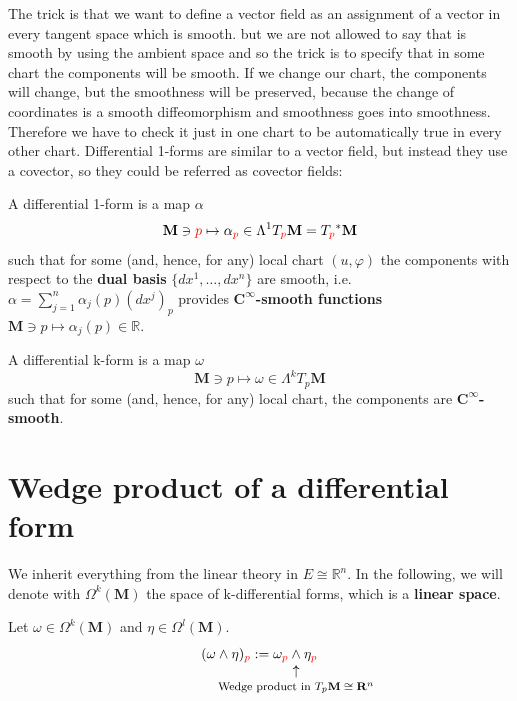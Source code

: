 \documentclass[../main.tex]{subfiles}
\begin{document}
The trick is that we want to define a vector field as an assignment of a vector in every tangent space which is smooth. but we are not allowed to say that is smooth by using the ambient space and so the trick is to specify that in some chart the components will be smooth. If we change our chart, the components will change, but the smoothness will be preserved, because the change of coordinates is a smooth diffeomorphism and smoothness goes into smoothness. Therefore we have to check it just in one chart to be automatically true in every other chart. Differential 1-forms are similar to a vector field, but instead they use a covector, so they could be referred as covector fields:
\begin{definition}
A differential 1-form is a map $\alpha$
\[
\mathbf{M}\ni{\color{red}p}\mapsto \alpha_{\color{red}p}\in\Lambda^1 T_{\color{red}p}\mathbf{M}=T_{\color{red}p}^*\mathbf{M}\]
such that for some (and, hence, for any) local chart $(u,\varphi)$ the components with respect to the \textbf{dual basis} $\{dx^1,\dots,dx^n\}$ are smooth, i.e. $\alpha=\sum_{j=1}^n\alpha_j(p)(dx^j)_p$ provides $\mathbf{C^{\infty}}$\textbf{-smooth functions} $\mathbf{M}\ni p \mapsto \alpha_j(p)\in\mathbb{R}$.
\end{definition}

\begin{definition}
A differential k-form is a map $\omega$ \[\mathbf{M}\ni p\mapsto\omega\in\Lambda^k T_p\mathbf{M}\] such that for some (and, hence, for any) local chart, the components are $\mathbf{C^{\infty}}$\textbf{-smooth}.
\end{definition}

\section{Wedge product of a differential form}
We inherit everything from the linear theory in $E\cong\mathbb{R}^n$. In the following, we will denote with $\Omega^k(\mathbf{M})$ the space of k-differential forms, which is a \textbf{linear space}.

\begin{definition}
Let $\omega\in\Omega^k(\mathbf{M})$ and $\eta\in\Omega^l(\mathbf{M})$.
\[
(\omega\wedge\eta)_{\color{red}p}:=\omega_{\color{red}p}\underset{\mathclap{\tikz \node {$\uparrow$} node [below=1ex] {\footnotesize Wedge product in $T_p\mathbf{M}\cong\mathbf{R}^n$ };}}\wedge\eta_{\color{red}p}
\]
\end{definition}
\end{document}
